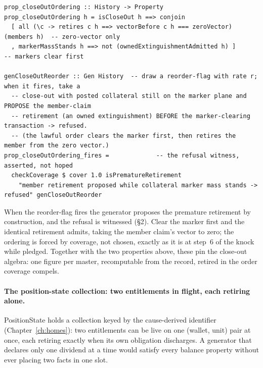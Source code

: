 \documentclass[11pt,a4paper]{article}
\begin{document}
\begin{lstlisting}
prop_closeOutOrdering :: History -> Property
prop_closeOutOrdering h = isCloseOut h ==> conjoin
  [ all (\c -> retires c h ==> vectorBefore c h === zeroVector) (members h)  -- zero-vector only
  , markerMassStands h ==> not (ownedExtinguishmentAdmitted h) ]             -- markers clear first

genCloseOutReorder :: Gen History  -- draw a reorder-flag with rate r; when it fires, take a
  -- close-out with posted collateral still on the marker plane and PROPOSE the member-claim
  -- retirement (an owned extinguishment) BEFORE the marker-clearing transaction -> refused.
  -- (the lawful order clears the marker first, then retires the member from the zero vector.)
prop_closeOutOrdering_fires =             -- the refusal witness, asserted, not hoped
  checkCoverage $ cover 1.0 isPrematureRetirement
    "member retirement proposed while collateral marker mass stands -> refused" genCloseOutReorder
\end{lstlisting}

When the reorder-flag fires the generator proposes the premature retirement by construction,
and the refusal is witnessed (\S 2). Clear the marker first and the identical retirement
admits, taking the member claim's vector to zero; the ordering is forced by coverage, not
chosen, exactly as it is at step~6 of the knock while pledged. Together with the two
properties above, these pin the close-out algebra: one figure per master, recomputable from
the record, retired in the order coverage compels.

\paragraph{The position-state collection: two entitlements in flight, each retiring alone.}
PositionState holds a collection keyed by the cause-derived identifier
(Chapter~\ref{ch:homes}): two entitlements can be live on one (wallet, unit) pair at once,
each retiring exactly when its own obligation discharges. A generator that declares only one
dividend at a time would satisfy every balance property without ever placing two facts in
one slot.
\end{document}
